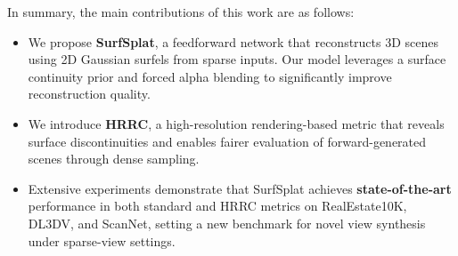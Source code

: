In summary, the main contributions of this work are as follows:
\begin{itemize}
    \item We propose \textbf{SurfSplat}, a feedforward network that reconstructs 3D scenes using 2D Gaussian surfels from sparse inputs. Our model leverages a surface continuity prior and forced alpha blending to significantly improve reconstruction quality.
    
    \item We introduce \textbf{HRRC}, a high-resolution rendering-based metric that reveals surface discontinuities and enables fairer evaluation of forward-generated scenes through dense sampling.
    
    \item Extensive experiments demonstrate that SurfSplat achieves \textbf{state-of-the-art} performance in both standard and HRRC metrics on RealEstate10K, DL3DV, and ScanNet, setting a new benchmark for novel view synthesis under sparse-view settings.
\end{itemize}




